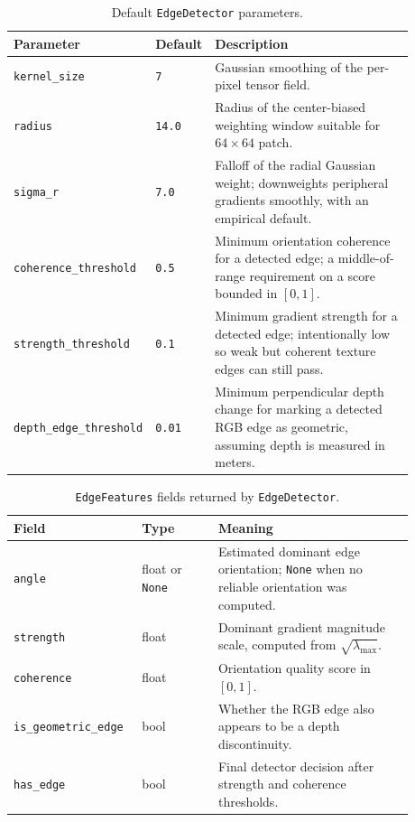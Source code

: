 \documentclass{article}
\begin{document}
\begin{table}[ht]
  \centering
  \begin{tabular}{p{0.25\linewidth} p{0.13\linewidth} p{0.50\linewidth}}
    \hline
    Parameter & Default & Description \\
    \hline
    \texttt{kernel\_size} & \texttt{7} & Gaussian smoothing of the per-pixel tensor field. \\
    \texttt{radius} & \texttt{14.0} & Radius of the center-biased weighting window suitable for $64 \times 64$ patch. \\
    \texttt{sigma\_r} & \texttt{7.0} & Falloff of the radial Gaussian weight; downweights peripheral gradients smoothly, with an empirical default. \\
    \texttt{coherence\_threshold} & \texttt{0.5} & Minimum orientation coherence for a detected edge; a middle-of-range requirement on a score bounded in $[0, 1]$. \\
    \texttt{strength\_threshold} & \texttt{0.1} & Minimum gradient strength for a detected edge; intentionally low so weak but coherent texture edges can still pass. \\
    \texttt{depth\_edge\_threshold} & \texttt{0.01} & Minimum perpendicular depth change for marking a detected RGB edge as geometric, assuming depth is measured in meters. \\
    \hline
  \end{tabular}
  \caption{Default \texttt{EdgeDetector} parameters.}
  \label{tab:edge-detector-parameters}
\end{table}

\begin{table}[ht]
  \centering
  \begin{tabular}{p{0.24\linewidth} p{0.18\linewidth} p{0.46\linewidth}}
    \hline
    Field & Type & Meaning \\
    \hline
    \texttt{angle} & float or \texttt{None} & Estimated dominant edge orientation; \texttt{None} when no reliable orientation was computed. \\
    \texttt{strength} & float & Dominant gradient magnitude scale, computed from $\sqrt{\lambda_{\max}}$. \\
    \texttt{coherence} & float & Orientation quality score in $[0, 1]$. \\
    \texttt{is\_geometric\_edge} & bool & Whether the RGB edge also appears to be a depth discontinuity. \\
    \texttt{has\_edge} & bool & Final detector decision after strength and coherence thresholds. \\
    \hline
  \end{tabular}
  \caption{\texttt{EdgeFeatures} fields returned by \texttt{EdgeDetector}.}
  \label{tab:edge-features}
\end{table}
\end{document}
